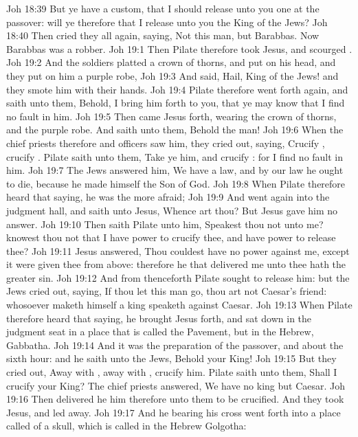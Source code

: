 \vs Joh 18:39 But ye have a custom, that I should release unto you one at the passover: will ye therefore that I release unto you the King of the Jews?
\vs Joh 18:40 Then cried they all again, saying, Not this man, but Barabbas. Now Barabbas was a robber.
\vs Joh 19:1 Then Pilate therefore took Jesus, and scourged .
\vs Joh 19:2 And the soldiers platted a crown of thorns, and put  on his head, and they put on him a purple robe,
\vs Joh 19:3 And said, Hail, King of the Jews! and they smote him with their hands.
\vs Joh 19:4 Pilate therefore went forth again, and saith unto them, Behold, I bring him forth to you, that ye may know that I find no fault in him.
\vs Joh 19:5 Then came Jesus forth, wearing the crown of thorns, and the purple robe. And  saith unto them, Behold the man!
\vs Joh 19:6 When the chief priests therefore and officers saw him, they cried out, saying, Crucify , crucify . Pilate saith unto them, Take ye him, and crucify : for I find no fault in him.
\vs Joh 19:7 The Jews answered him, We have a law, and by our law he ought to die, because he made himself the Son of God.
\vs Joh 19:8 When Pilate therefore heard that saying, he was the more afraid;
\vs Joh 19:9 And went again into the judgment hall, and saith unto Jesus, Whence art thou? But Jesus gave him no answer.
\vs Joh 19:10 Then saith Pilate unto him, Speakest thou not unto me? knowest thou not that I have power to crucify thee, and have power to release thee?
\vs Joh 19:11 Jesus answered, Thou couldest have no power  against me, except it were given thee from above: therefore he that delivered me unto thee hath the greater sin.
\vs Joh 19:12 And from thenceforth Pilate sought to release him: but the Jews cried out, saying, If thou let this man go, thou art not Caesar's friend: whosoever maketh himself a king speaketh against Caesar.
\vs Joh 19:13 When Pilate therefore heard that saying, he brought Jesus forth, and sat down in the judgment seat in a place that is called the Pavement, but in the Hebrew, Gabbatha.
\vs Joh 19:14 And it was the preparation of the passover, and about the sixth hour: and he saith unto the Jews, Behold your King!
\vs Joh 19:15 But they cried out, Away with , away with , crucify him. Pilate saith unto them, Shall I crucify your King? The chief priests answered, We have no king but Caesar.
\vs Joh 19:16 Then delivered he him therefore unto them to be crucified. And they took Jesus, and led  away.
\vs Joh 19:17 And he bearing his cross went forth into a place called  of a skull, which is called in the Hebrew Golgotha:
